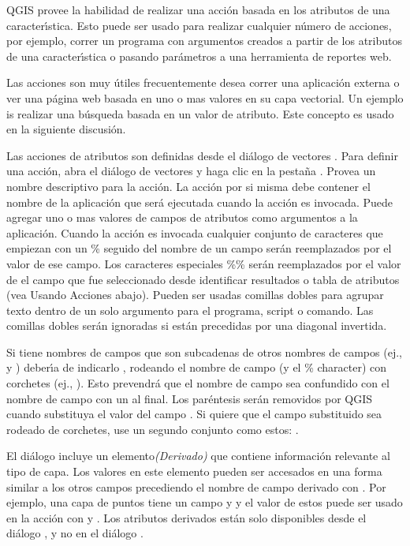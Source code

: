 QGIS provee la habilidad de realizar una acci\'on basada en los atributos de una
caracter\'{\i}stica. Esto puede ser usado para realizar cualquier n\'umero de acciones, por ejemplo,
correr un programa con argumentos creados a partir de los atributos de una caracter\'{\i}stica o
pasando par\'ametros a una herramienta de reportes web.

Las acciones son muy \'utiles frecuentemente desea correr una aplicaci\'on externa o ver
una p\'agina web basada en uno o mas valores en su capa vectorial. Un ejemplo
is realizar una b\'usqueda basada en un valor de atributo. Este concepto es usado en la  
siguiente discusi\'on.


Las acciones de atributos son definidas desde el di\'alogo de vectores . Para definir una
acci\'on, abra el di\'alogo de vectores  y haga clic en la
pesta\~na . Provea un nombre descriptivo para la acci\'on. La acci\'on por si misma
debe contener el nombre de la aplicaci\'on que ser\'a ejecutada cuando la acci\'on es invocada.
Puede agregar uno o mas valores de campos de atributos como argumentos
a la aplicaci\'on. Cuando la acci\'on es invocada cualquier conjunto de caracteres que empiezan
con un \% seguido del nombre de un campo ser\'an reemplazados por el valor de ese campo.
Los caracteres especiales \%\% \index{\%\%}ser\'an reemplazados por el valor
de el campo que fue seleccionado desde identificar resultados o tabla de atributos (vea
Usando Acciones abajo).  Pueden ser usadas comillas dobles para agrupar texto dentro
de un solo argumento para el programa, script o comando. Las comillas dobles ser\'an ignoradas
si est\'an precedidas por una diagonal invertida.

Si tiene nombres de campos que son subcadenas de otros nombres de campos (ej., 
y ) deber\'{\i}a de indicarlo
, rodeando el nombre de campo (y el \% character) con 
corchetes (ej., \usertext{[\%col10]}). Esto prevendr\'a que el nombre de campo 
sea confundido con el nombre de campo  con un 
al final. Los par\'entesis ser\'an removidos por QGIS cuando substituya el valor del campo
. Si quiere que el campo substituido sea rodeado de corchetes,
use un segundo conjunto como estos: \usertext{[[\%col10]]}.

El di\'alogo  incluye un elemento{\em (Derivado)} que
contiene informaci\'on relevante al tipo de capa. Los valores
en este elemento pueden ser accesados en una forma similar a los otros campos
precediendo el nombre de campo derivado  con . Por
ejemplo, una capa de puntos tiene un campo  y  y el
valor de estos puede ser usado en la acci\'on con  y
. Los atributos derivados est\'an solo disponibles desde el di\'alogo
, y no en el di\'alogo .

